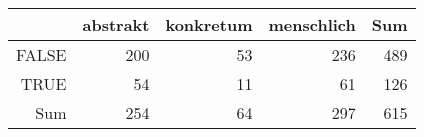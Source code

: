 \begin{tabular}{rrrrr}
  \hline
 & abstrakt & konkretum & menschlich & Sum \\ 
  \hline
FALSE & 200 & 53 & 236 & 489 \\ 
  TRUE & 54 & 11 & 61 & 126 \\ 
  Sum & 254 & 64 & 297 & 615 \\ 
   \hline
\end{tabular}
